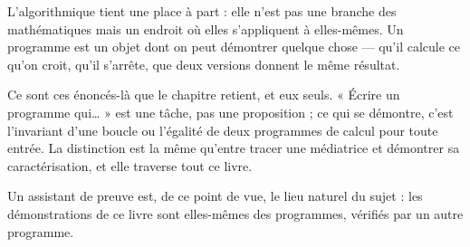 L'algorithmique tient une place à part : elle n'est pas une branche des mathématiques mais un
endroit où elles s'appliquent à elles-mêmes. Un programme est un objet dont on peut démontrer
quelque chose — qu'il calcule ce qu'on croit, qu'il s'arrête, que deux versions donnent le
même résultat.

Ce sont ces énoncés-là que le chapitre retient, et eux seuls. « Écrire un programme qui… »
est une tâche, pas une proposition ; ce qui se démontre, c'est l'invariant d'une boucle ou
l'égalité de deux programmes de calcul pour toute entrée. La distinction est la même
qu'entre tracer une médiatrice et démontrer sa caractérisation, et elle traverse tout ce
livre.

Un assistant de preuve est, de ce point de vue, le lieu naturel du sujet : les démonstrations
de ce livre sont elles-mêmes des programmes, vérifiés par un autre programme.
